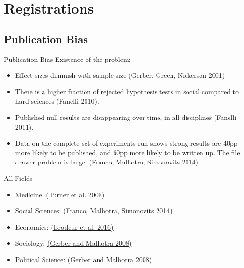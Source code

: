 \documentclass{beamer}
\begin{document}
\section{Registrations}

\subsection*{Publication Bias}
\begin{frame}{Publication Bias}%
  Existence of the problem:
  \begin{itemize}[<.->]
  \item
 Effect sizes diminish with sample size (Gerber, Green, Nickerson 2001)
  \item
  There is a higher fraction of rejected hypothesis tests in social compared to hard sciences (Fanelli 2010).
  \item
  	Published null results are disappearing over time, in all disciplines (Fanelli 2011). 
  \item
  	Data on the complete set of experiments run shows strong results are 40pp more likely to be published, and 60pp more likely to be written up. The file drawer problem is large. (Franco, Malhotra, Simonovits 2014)
  \end{itemize}
\end{frame}


\begin{frame}{All Fields}
\begin{itemize}[<.->]
\item Medicine: \href{http://www.nejm.org/doi/full/10.1056/nejmsa065779}{(Turner et al. 2008)}
\item Social Sciences: \href{http://science.sciencemag.org/content/345/6203/1502.short}{(Franco, Malhotra, Simonovits 2014)}
\item Economics: \href{https://www.aeaweb.org/articles.php?doi=10.1257/app.20150044}{(Brodeur et al. 2016)}
\item Sociology: \href{http://smr.sagepub.com/content/37/1/3.short}{(Gerber and Malhotra 2008)}
\item Political Science: \href{http://nowpublishers.com/article/Details/QJPS-8024}{(Gerber and Malhotra 2008)}
\end{itemize}
\end{frame}
\end{document}
